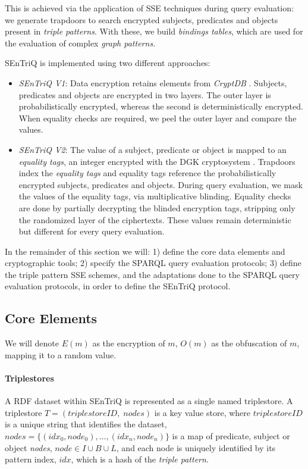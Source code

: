 This is achieved via the application of \gls{SSE} techniques during query evaluation: we generate trapdoors to search encrypted subjects, predicates and objects present in \emph{triple patterns}. With these, we build \emph{bindings tables}, which are used for the evaluation of complex \emph{graph patterns}.

\gls{SEnTriQ} is implemented using two different approaches:

\begin{itemize}
    \item \emph{\gls{SEnTriQ} V1}: Data encryption retains elements from \emph{CryptDB} \autocite{Popa2011-zb, Popa2012-bw, Popa2011-ci}. Subjects, predicates and objects are encrypted in two layers. The outer layer is probabilistically encrypted, whereas the second is deterministically encrypted. When equality checks are required, we peel the outer layer and compare the values.

    \item \emph{\gls{SEnTriQ} V2}: The value of a subject, predicate or object is mapped to an \emph{equality tags}, an integer encrypted with the \gls{DGK} cryptosystem \autocite{Damgard2007-km, Damgard2009-my, Franz2011-sm, Makkes2010-qb}. Trapdoors index the \emph{equality tags} and equality tags reference the probabilistically encrypted subjects, predicates and objects. During query evaluation, we mask the values of the equality tags, via multiplicative blinding. Equality checks are done by partially decrypting the blinded encryption tags, stripping only the randomized layer of the ciphertexts. These values remain deterministic but different for every query evaluation.
\end{itemize}

In the remainder of this section we will: 1) define the core data elements and cryptographic tools; 2) specify the \gls{SPARQL} query evaluation protocols; 3) define the triple pattern \gls{SSE} schemes, and the adaptations done to the \gls{SPARQL} query evaluation protocols, in order to define the \gls{SEnTriQ} protocol.

\subsection{Core Elements}
We will denote $E(m)$ as the encryption of $m$, $O(m)$ as the obfuscation of $m$, mapping it to a random value.

\paragraph{Triplestores} A \gls{RDF} dataset within \gls{SEnTriQ} is represented as a single named triplestore. A triplestore $T = (triplestoreID,\; nodes)$ is a key value store, where $triplestoreID$ is a unique string that identifies the dataset, $nodes = \{(idx_{0}, node_{0}), ... ,(idx_{n},\allowbreak node_{n})\}$ is a map of predicate, subject or object \emph{nodes}, $node \in I \cup B \cup L$, and each node is uniquely identified by its pattern index, $idx$, which is a hash of the \emph{triple pattern}.

